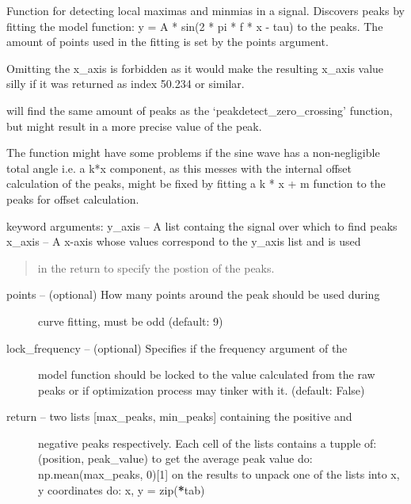 \documentclass[letterpaper,10pt,english]{sphinxmanual}
\begin{document}
\begin{fulllineitems}
\label{code:peakdet.peakdetect_sine}
Function for detecting local maximas and minmias in a signal.
Discovers peaks by fitting the model function:
y = A * sin(2 * pi * f * x - tau) to the peaks. The amount of points used
in the fitting is set by the points argument.

Omitting the x\_axis is forbidden as it would make the resulting x\_axis
value silly if it was returned as index 50.234 or similar.

will find the same amount of peaks as the `peakdetect\_zero\_crossing'
function, but might result in a more precise value of the peak.

The function might have some problems if the sine wave has a
non-negligible total angle i.e. a k*x component, as this messes with the
internal offset calculation of the peaks, might be fixed by fitting a 
k * x + m function to the peaks for offset calculation.

keyword arguments:
y\_axis -- A list containg the signal over which to find peaks
x\_axis -- A x-axis whose values correspond to the y\_axis list and is used
\begin{quote}

in the return to specify the postion of the peaks.
\end{quote}
\begin{description}
\item[{points -- (optional) How many points around the peak should be used during}] \leavevmode
curve fitting, must be odd (default: 9)

\item[{lock\_frequency -- (optional) Specifies if the frequency argument of the}] \leavevmode
model function should be locked to the value calculated from the raw
peaks or if optimization process may tinker with it. (default: False)

\item[{return -- two lists {[}max\_peaks, min\_peaks{]} containing the positive and}] \leavevmode
negative peaks respectively. Each cell of the lists contains a tupple
of: (position, peak\_value) 
to get the average peak value do: np.mean(max\_peaks, 0){[}1{]} on the
results to unpack one of the lists into x, y coordinates do: 
x, y = zip({\color{red}\bfseries{}*}tab)

\end{description}

\end{fulllineitems}
\end{document}
